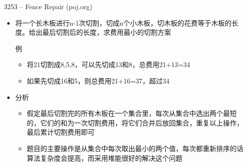 \begin{frame}{3253 -- Fence Repair (poj.org)}
    \begin{itemize}
        \item 将一个长木板进行n-1次切割，切成n个小木板，切木板的花费等于木板的长度。给出最后切割后的长度，求费用最小的切割方案
        \begin{exampleblock}{例}
            \begin{itemize}
                \item 将21切割成8,5,8，可以先切成13和8，总费用21+13=34
                \item 如果先切成16和5，则总费用21+16=37，超过34
            \end{itemize}
        \end{exampleblock}
        \item 分析
        \begin{itemize}
            \item 假定最后切割完的所有木板在一个集合里，每次从集合中选出两个最短的，它们的和为一次切割费用，将它们合并后放回集合，重复以上操作，最后累计切割费用即可
            \item 题目的主要操作是从集合中每次取出最小的两个值，每次都重新排序的话算法复杂度会提高，而采用堆能很好的解决这个问题
        \end{itemize}
    \end{itemize}
\end{frame}

